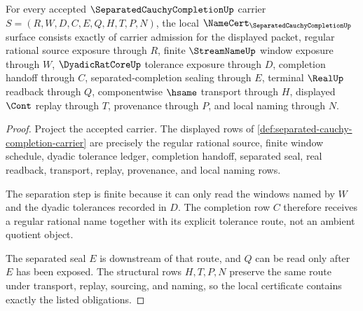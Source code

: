 \begin{theorem}
\label{thm:separated-cauchy-completion-namecert-obligations}
For every accepted $\SeparatedCauchyCompletionUp$ carrier $S=(R,W,D,C,E,Q,H,T,P,N)$, the local $\NameCert_{\SeparatedCauchyCompletionUp}$ surface consists exactly of carrier admission for the displayed packet, regular rational source exposure through $R$, finite $\StreamNameUp$ window exposure through $W$, $\DyadicRatCoreUp$ tolerance exposure through $D$, completion handoff through $C$, separated-completion sealing through $E$, terminal $\RealUp$ readback through $Q$, componentwise $\hsame$ transport through $H$, displayed $\Cont$ replay through $T$, provenance through $P$, and local naming through $N$.
\end{theorem}
\begin{proof}
Project the accepted carrier. The displayed rows of \autoref{def:separated-cauchy-completion-carrier} are precisely the regular rational source, finite window schedule, dyadic tolerance ledger, completion handoff, separated seal, real readback, transport, replay, provenance, and local naming rows.

The separation step is finite because it can only read the windows named by $W$ and the dyadic tolerances recorded in $D$. The completion row $C$ therefore receives a regular rational name together with its explicit tolerance route, not an ambient quotient object.

The separated seal $E$ is downstream of that route, and $Q$ can be read only after $E$ has been exposed. The structural rows $H,T,P,N$ preserve the same route under transport, replay, sourcing, and naming, so the local certificate contains exactly the listed obligations.
\end{proof}

